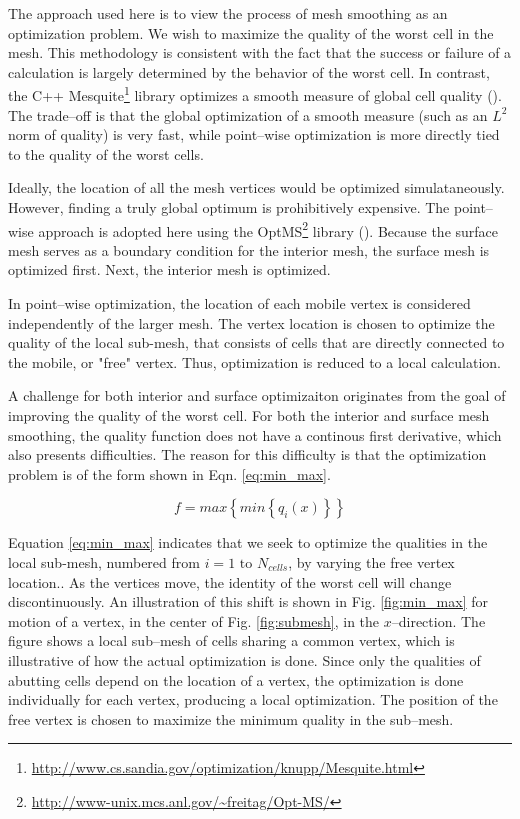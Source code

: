 \documentclass[a4paper,12pt,notitlepage]{article}
\begin{document}
The approach used here is to view the process of mesh smoothing as an
optimization problem.  We wish to maximize the quality of the worst
cell in the mesh.  This methodology is consistent with the fact that
the success or failure of a calculation is largely
determined by the behavior of the worst cell.  In contrast, the C++
Mesquite\footnote{\url{http://www.cs.sandia.gov/optimization/knupp/Mesquite.html}}
library optimizes a smooth measure of global cell quality
(\cite{mesquite:freitag,mesquite:brewer}).  The trade--off is that the
global optimization of a smooth measure (such as an $L^{2}$ norm of
quality) is very fast, while point--wise optimization is more directly
tied to the quality of the worst cells.

Ideally, the location of all the mesh vertices would be optimized
simulataneously.  However, finding a truly global optimum is prohibitively expensive.
The point--wise approach is adopted here using the
OptMS\footnote{\url{http://www-unix.mcs.anl.gov/~freitag/Opt-MS/}}
library (\cite{optms:manual}).  Because the surface mesh serves as a
boundary condition for the interior mesh, the surface mesh is
optimized first.  Next, the interior mesh is optimized.

In point--wise optimization, the location of each mobile vertex is considered independently of the larger mesh.  The vertex location is chosen to optimize the quality of the local sub-mesh, that consists of cells that are directly connected to the mobile, or "free" vertex.  Thus, optimization is reduced to a local calculation.

A challenge for both interior and surface optimizaiton originates
from the goal of improving the quality of the worst cell.  For
both the interior and surface mesh smoothing, the quality function
does not have a continous first derivative, which also presents
difficulties.  The reason for this difficulty is that the optimization
problem is of the form shown in Eqn. \ref{eq:min_max}.

\begin{equation}
  \label{eq:min_max}
  f=max \left\lbrace min \left\lbrace q_i \left(
        x\right)\right\rbrace \right\rbrace
\end{equation}

Equation \ref{eq:min_max} indicates that we seek to optimize the
qualities in the local sub-mesh, numbered from $i=1 \mbox{ to } N_{cells}$, by varying the
free vertex location..  As
the vertices move, the identity of the worst cell will change
discontinuously.  An illustration of this shift is shown in
Fig. \ref{fig:min_max} for motion of a vertex, in the center of
Fig. \ref{fig:submesh}, in the $x$--direction.  The figure shows a
local sub--mesh of cells sharing a common vertex, which is illustrative
of how the actual optimization is done.  Since only the qualities of
abutting cells depend on the location of a vertex, the optimization is
done individually for each vertex, producing a local optimization.
The position of the
free vertex is chosen to maximize the minimum quality in the
sub--mesh.
\end{document}
